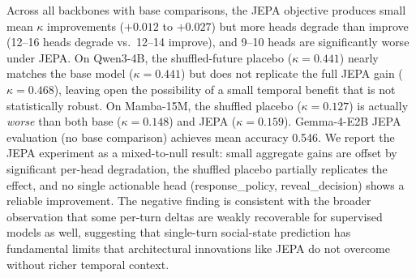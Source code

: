 \documentclass[11pt]{article}
\begin{document}
\begin{table}[tp]
\centering
\caption{JEPA per-backbone results. Positive $\Delta$ means JEPA improves over base. Shuffled-future placebo partially replicates gains, indicating temporal structure is not the sole driver.}
\label{tab:jepa_appendix}
\footnotesize\setlength{\tabcolsep}{2pt}
\end{table}

Across all backbones with base comparisons, the JEPA objective produces small mean $\kappa$ improvements ($+0.012$ to $+0.027$) but more heads degrade than improve (12--16 heads degrade vs.\ 12--14 improve), and 9--10 heads are significantly worse under JEPA.
On Qwen3-4B, the shuffled-future placebo ($\kappa{=}0.441$) nearly matches the base model ($\kappa{=}0.441$) but does not replicate the full JEPA gain ($\kappa{=}0.468$), leaving open the possibility of a small temporal benefit that is not statistically robust.
On Mamba-15M, the shuffled placebo ($\kappa{=}0.127$) is actually \textit{worse} than both base ($\kappa{=}0.148$) and JEPA ($\kappa{=}0.159$).
Gemma-4-E2B JEPA evaluation (no base comparison) achieves mean accuracy 0.546.
We report the JEPA experiment as a mixed-to-null result: small aggregate gains are offset by significant per-head degradation, the shuffled placebo partially replicates the effect, and no single actionable head (response\_policy, reveal\_decision) shows a reliable improvement.
The negative finding is consistent with the broader observation that some per-turn deltas are weakly recoverable for supervised models as well, suggesting that single-turn social-state prediction has fundamental limits that architectural innovations like JEPA do not overcome without richer temporal context.
\end{document}
